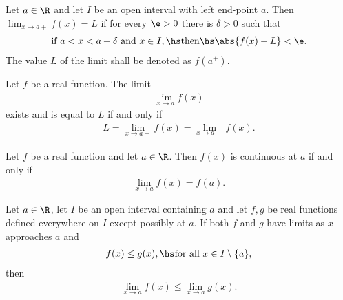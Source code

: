 \documentclass{article}
\begin{document}
\begin{theorem}
    Let $a\in\R$ and let $I$ be an open interval with left end-point
    $a$. Then $\lim_{x\to a+} f(x)=L$ if for every $\e>0$ there is
    $\delta>0$ such that
    \begin{align*}
        \text{if } a<x<a+\delta \text{ and }x\in I,\hs
        \text{then}\hs \abs{f(x)-L}<\e.
    \end{align*}
    The value $L$ of the limit shall be denoted as $f(a^+)$.
\end{theorem}

\begin{theorem}
    Let $f$ be a real function. The limit
    \begin{align*}
        \lim_{x\to a}f(x)
    \end{align*}
    exists and is equal to $L$ if and only if
    \begin{align*}
        L=\lim_{x\to a+}f(x)=\lim_{x\to a-}f(x).
    \end{align*}
\end{theorem}

\begin{proposition}
    Let $f$ be a real function and let $a\in\R$. Then
    $f(x)$ is continuous at $a$ if and only if
    \begin{align*}
        \lim_{x\to a}f(x)=f(a).
    \end{align*}
\end{proposition}

\setcounter{theorem}{9}
\begin{theorem}
    Let $a\in\R$, let $I$ be an open interval containing
    $a$ and let $f,g$ be real functions defined everywhere
    on $I$ except possibly at $a$. If both $f$ and $g$ have
    limits as $x$ approaches $a$ and
    \begin{align*}
        f(x)\leq g(x),\hs\text{for all }x\in I\setminus\{a\},
    \end{align*}
    then
    \begin{align*}
        \lim_{x\to a}f(x)\leq\lim_{x\to a} g(x).
    \end{align*}

\end{theorem}
\end{document}

